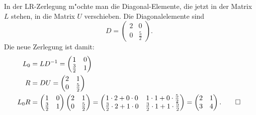 \begin{loesung}
In der LR-Zerlegung m"ochte man die Diagonal-Elemente, die jetzt in
der Matrix $L$ stehen, in die Matrix $U$ verschieben. Die Diagonalelemente
sind
\[
D=\begin{pmatrix}2&0\\0&\frac52\end{pmatrix}.
\]
Die neue Zerlegung ist damit:
\begin{align*}
L_0&=LD^{-1}=
\begin{pmatrix}
1&0\\
\frac32&1
\end{pmatrix}
\\
R&=DU=
\begin{pmatrix}
2&1\\
0&\frac52
\end{pmatrix}
\\
L_0R&=
\begin{pmatrix}
1&0\\
\frac32&1
\end{pmatrix}
\begin{pmatrix}
2&1\\
0&\frac52
\end{pmatrix}
=\begin{pmatrix}
1\cdot 2+0\cdot 0 & 1 \cdot 1+0\cdot \frac52\\
\frac32\cdot 2+1\cdot 0&\frac32\cdot 1+1\cdot\frac52
\end{pmatrix}
=
\begin{pmatrix}
2&1\\3&4
\end{pmatrix}.
\qedhere
\end{align*}
\end{loesung}


